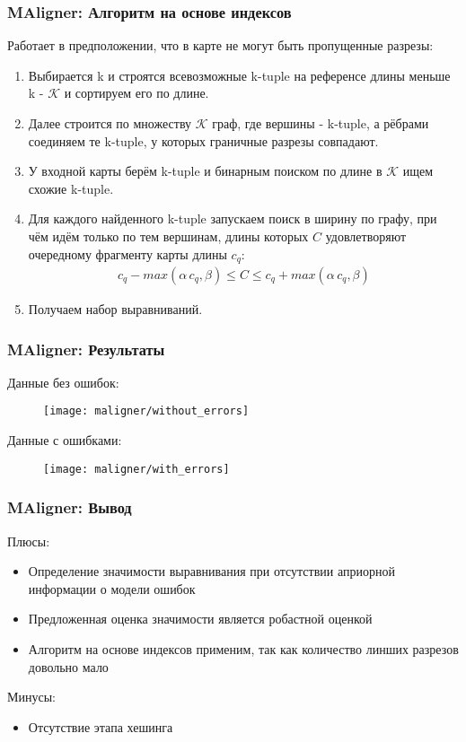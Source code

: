 \begin{frame}
\frametitle{MAligner: Алгоритм на основе индексов}
Работает в предположении, что в карте не могут быть пропущенные разрезы:
\begin{enumerate}
  \item Выбирается k и строятся всевозможные k-tuple на референсе длины меньше k - $\mathcal{K}$ и сортируем его по длине.
  \item Далее строится по множеству $\mathcal{K}$ граф, где вершины - k-tuple, а рёбрами соединяем те k-tuple, у которых граничные разрезы совпадают.
  \item У входной карты берём k-tuple и бинарным поиском по длине в $\mathcal{K}$ ищем схожие k-tuple.
  \item Для каждого найденного k-tuple  запускаем поиск в ширину по графу, при чём идём только по тем вершинам, длины которых $C$ удовлетворяют очередному фрагменту карты длины $c_q$:
  \begin{gather*}
     c_q - max(\alpha \, c_q, \beta) \le C \le c_q + max(\alpha \, c_q, \beta)
  \end{gather*}
  \item Получаем набор выравниваний.
\end{enumerate}
\end{frame}

\begin{frame}
\frametitle{MAligner: Результаты}
  Данные без ошибок:
  \begin{figure}
    \centering
    \texttt{[image: maligner/without\_errors]}
  \end{figure}
  Данные с ошибками:
  \begin{figure}
    \centering
    \texttt{[image: maligner/with\_errors]}
  \end{figure}

\end{frame}

\begin{frame}
\frametitle{MAligner: Вывод }
Плюсы:
\begin{itemize}
  \item Определение значимости выравнивания при отсутствии априорной информации о модели ошибок
  \item Предложенная оценка значимости является робастной оценкой
  \item Алгоритм на основе индексов применим, так как количество линших разрезов довольно мало
\end{itemize}
Минусы:
\begin{itemize}
  \item Отсутствие этапа хешинга
\end{itemize}
\end{frame}
